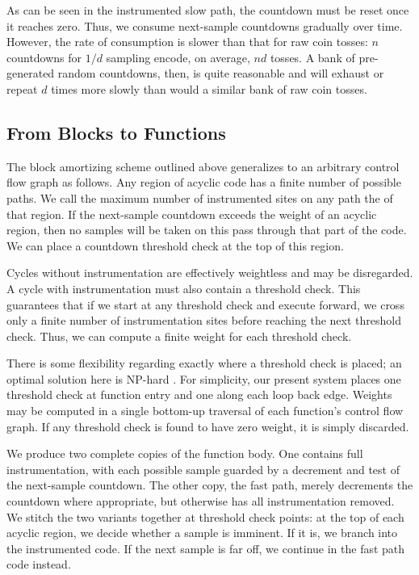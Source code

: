 As can be seen in the instrumented slow path, the countdown must be
reset once it reaches zero.  Thus, we consume next-sample countdowns
gradually over time.  However, the rate of consumption is slower than
that for raw coin tosses: $n$ countdowns for $1/d$ sampling encode, on
average, $nd$ tosses.  A bank of pre-generated random countdowns,
then, is quite reasonable and will exhaust or repeat $d$ times more
slowly than would a similar bank of raw coin tosses.

\subsection{From Blocks to Functions}

The block amortizing scheme outlined above generalizes to an arbitrary
control flow graph as follows.  Any region of acyclic code has a
finite number of possible paths.  We call the maximum number of
instrumented sites on any path the  of that region.
If the next-sample countdown exceeds the weight of an acyclic region,
then no samples will be taken on this pass through that part of the
code.  We can place a countdown threshold check at the top of this
region.

Cycles without instrumentation are effectively weightless and may be
disregarded.  A cycle with instrumentation must also contain a
threshold check.  This guarantees that if we start at any threshold
check and execute forward, we cross only a finite number of
instrumentation sites before reaching the next threshold check.  Thus,
we can compute a finite weight for each threshold check.

There is some flexibility regarding exactly where a threshold check is
placed; an optimal solution here is NP-hard
\cite{Hirzel:2001:BT-FLOTP}.  For simplicity, our present system
places one threshold check at function entry and one along each loop
back edge.  Weights may be computed in a single bottom-up traversal of
each function's control flow graph.  If any threshold check is found
to have zero weight, it is simply discarded.

We produce two complete copies of the function body.  One contains
full instrumentation, with each possible sample guarded by a decrement
and test of the next-sample countdown.  The other copy, the fast path,
merely decrements the countdown where appropriate, but otherwise has
all instrumentation removed.  We stitch the two variants together at
threshold check points: at the top of each acyclic region, we decide
whether a sample is imminent.  If it is, we branch into the
instrumented code.  If the next sample is far off, we continue in the
fast path code instead.

